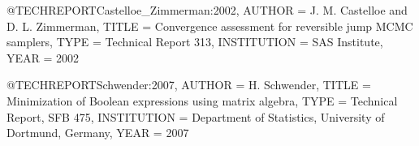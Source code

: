 
@TECHREPORT{Castelloe_Zimmerman:2002,
  AUTHOR =       {J. M. Castelloe and D. L. Zimmerman},
  TITLE =        {Convergence assessment for reversible jump {MCMC} samplers},
  TYPE =         {Technical Report 313},
  INSTITUTION =  {SAS Institute},
  YEAR =         {2002}
}

@TECHREPORT{Schwender:2007,
  AUTHOR =       {H. Schwender},
  TITLE =        {Minimization of {B}oolean expressions using matrix algebra},
  TYPE =         {Technical Report, SFB 475},
  INSTITUTION =  {Department of Statistics, University of Dortmund, Germany},
  YEAR =         {2007}
}